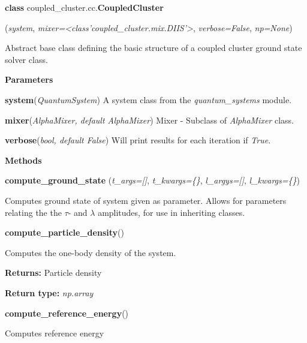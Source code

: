\begin{tcolorbox}
    {\selectfont
    \textbf{class} coupled\_cluster.cc.\textbf{CoupledCluster}

    \hspace{1em}(\emph{system}, \emph{mixer=<class'coupled\_cluster.mix.DIIS'>}, 
        \emph{verbose=False}, \emph{np=None})

    \vspace{1em}
    Abstract base class defining the basic structure of a coupled cluster ground state 
    solver class.
    
    \vspace{1em}
    \textbf{Parameters}

    \hspace{2em}\textbf{system}(\emph{QuantumSystem}) A system class from the 
        \emph{quantum\_systems} module.

    \hspace{2em}\textbf{mixer}(\emph{AlphaMixer, default AlphaMixer}) Mixer - 
        Subclass of \emph{AlphaMixer} class.

    \hspace{2em}\textbf{verbose}(\emph{bool, default False}) Will print results 
        for each iteration if \emph{True}.

    \vspace{1em}
    \textbf{Methods}

    \hspace{2em} \textbf{compute\_ground\_state}
        (\emph{t\_args=[]}, \emph{t\_kwargs=\{\}}, \emph{l\_argys=[]}, \emph{l\_kwargs=\{\}})
        \begin{adjustwidth}{4em}{}
        Computes ground state of system given as parameter. Allows for parameters relating 
        the the $\tau$- and $\lambda$ amplitudes, for use in inheriting classes.
        \end{adjustwidth}
    
    \hspace{2em} \textbf{compute\_particle\_density}()
        \begin{adjustwidth}{4em}{}
        Computes the one-body density of the system.
   
        \textbf{Returns:} Particle density 
  
        \textbf{Return type:} \emph{np.array}
        \end{adjustwidth}
    
    \hspace{2em} \textbf{compute\_reference\_energy}()
        \begin{adjustwidth}{4em}{}
        Computes reference energy


\end{adjustwidth}}
\end{tcolorbox}
